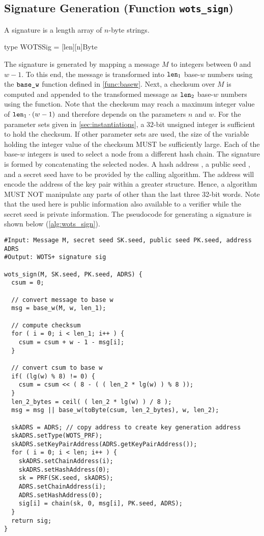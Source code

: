 \subsection{\wotsp Signature Generation (Function \texttt{wots\_sign})}
A \wotsp signature is a length \len array of $n$-byte strings.
\begin{code}
  type WOTSSig = [len][n]Byte
\end{code}
The \wotsp signature
is generated by mapping a message $M$ to \len integers between $0$ and $w - 1$.  To
this end, the message is transformed into $\texttt{len}_1$ base-$w$ numbers using
the $\texttt{base\_w}$ function defined in \autoref{func:basew}. Next, a checksum 
over $M$ is 
computed and appended to the transformed message as $\texttt{len}_2$ base-$w$ numbers 
using the \basew function. Note that the checksum may reach a maximum integer
value of $\texttt{len}_1 \cdot (w - 1)$ and therefore depends on the
parameters $n$ and $w$. For the parameter sets given in 
\autoref{sec:instantiations}, a $32$-bit unsigned
integer is sufficient to hold the checksum. If other parameter sets are used, the 
size of the variable holding the integer value of the checksum MUST be 
sufficiently large. Each of the base-$w$ integers is used to 
select a node from a different hash chain. The signature is formed by 
concatenating the selected
nodes. A \wotsp hash address \adrs, a public seed \pseed,
and a secret seed \sseed have to be provided by 
the calling algorithm. The address will encode 
the address of the \wotsp key pair within a greater structure. Hence, a \wotsp 
algorithm MUST NOT manipulate any parts of \adrs other than the last three 
32-bit words. Note that the \pseed used here is public information also 
available to a verifier while the secret seed \sseed is private information. 
The pseudocode for generating a \wotsp
signature  \wotssig is shown below 
(\autoref{alg:wots_sign}).

\begin{lstlisting}[label=alg:wots_sign, language=pseudoc,
                   caption=\texttt{wots\_sign} -- Generating a WOTS+ signature on a message $M$.]
#Input: Message M, secret seed SK.seed, public seed PK.seed, address ADRS
#Output: WOTS+ signature sig

wots_sign(M, SK.seed, PK.seed, ADRS) {
  csum = 0;

  // convert message to base w
  msg = base_w(M, w, len_1);

  // compute checksum
  for ( i = 0; i < len_1; i++ ) {
    csum = csum + w - 1 - msg[i];
  }

  // convert csum to base w
  if( (lg(w) % 8) != 0) {
    csum = csum << ( 8 - ( ( len_2 * lg(w) ) % 8 ));
  }
  len_2_bytes = ceil( ( len_2 * lg(w) ) / 8 );
  msg = msg || base_w(toByte(csum, len_2_bytes), w, len_2);
  
  skADRS = ADRS; // copy address to create key generation address
  skADRS.setType(WOTS_PRF);
  skADRS.setKeyPairAddress(ADRS.getKeyPairAddress());
  for ( i = 0; i < len; i++ ) {
    skADRS.setChainAddress(i);
    skADRS.setHashAddress(0);
    sk = PRF(SK.seed, skADRS);
    ADRS.setChainAddress(i);
    ADRS.setHashAddress(0);
    sig[i] = chain(sk, 0, msg[i], PK.seed, ADRS);
  }
  return sig;
}
\end{lstlisting}

